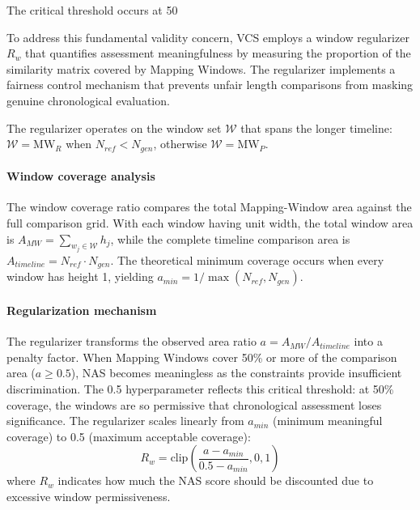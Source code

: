 \documentclass[main.tex]{subfiles}
\begin{document}
The critical threshold occurs at 50%

To address this fundamental validity concern, VCS employs a window regularizer $R_w$ that quantifies assessment meaningfulness by measuring the proportion of the similarity matrix covered by Mapping Windows. The regularizer implements a fairness control mechanism that prevents unfair length comparisons from masking genuine chronological evaluation.

The regularizer operates on the window set $\mathcal{W}$ that spans the longer timeline: $\mathcal{W} = \text{MW}_{R}$ when $N_{ref} < N_{gen}$, otherwise $\mathcal{W} = \text{MW}_{P}$.

\paragraph{Window coverage analysis}
The window coverage ratio compares the total Mapping-Window area against the full comparison grid. With each window having unit width, the total window area is $A_{MW} = \sum_{w_j \in \mathcal{W}} h_j$, while the complete timeline comparison area is $A_{timeline} = N_{ref} \cdot N_{gen}$. The theoretical minimum coverage occurs when every window has height 1, yielding $a_{min} = 1/\max(N_{ref}, N_{gen})$.

\paragraph{Regularization mechanism}
The regularizer transforms the observed area ratio $a = A_{MW}/A_{timeline}$ into a penalty factor. When Mapping Windows cover 50\% or more of the comparison area ($a \geq 0.5$), NAS becomes meaningless as the constraints provide insufficient discrimination. The 0.5 hyperparameter reflects this critical threshold: at 50\% coverage, the windows are so permissive that chronological assessment loses significance. The regularizer scales linearly from $a_{min}$ (minimum meaningful coverage) to 0.5 (maximum acceptable coverage):
\begin{equation}
R_w = \text{clip}\left(\frac{a - a_{min}}{0.5 - a_{min}}, 0, 1\right)
\end{equation}
where $R_w$ indicates how much the NAS score should be discounted due to excessive window permissiveness.
\end{document}
